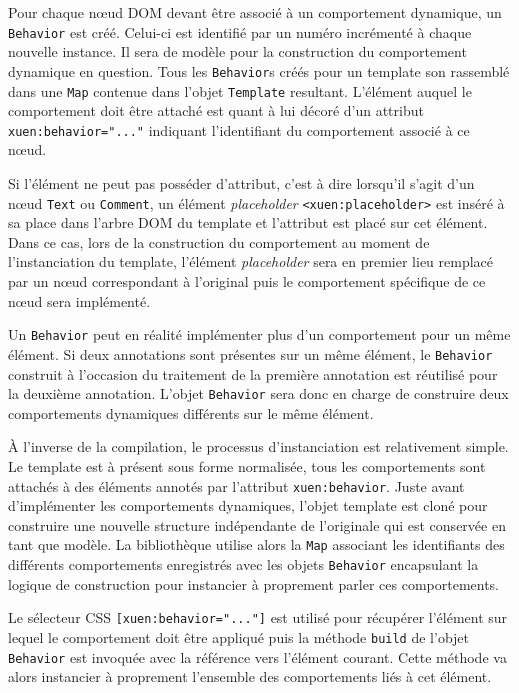 Pour chaque nœud DOM devant être associé à un comportement dynamique, un \texttt{Behavior} est créé. Celui-ci est identifié par un numéro incrémenté à chaque nouvelle instance. Il sera de modèle pour la construction du comportement dynamique en question. Tous les \texttt{Behavior}s créés pour un template son rassemblé dans une \texttt{Map} contenue dans l'objet \texttt{Template} resultant. L'élément auquel le comportement doit être attaché est quant à lui décoré d'un attribut \texttt{xuen:behavior="..."} indiquant l'identifiant du comportement associé à ce nœud.

Si l'élément ne peut pas posséder d'attribut, c'est à dire lorsqu'il s'agit d'un nœud \texttt{Text} ou \texttt{Comment}, un élément \emph{placeholder} \texttt{<xuen:placeholder>} est inséré à sa place dans l'arbre DOM du template et l'attribut est placé sur cet élément. Dans ce cas, lors de la construction du comportement au moment de l'instanciation du template, l'élément \emph{placeholder} sera en premier lieu remplacé par un nœud correspondant à l'original puis le comportement spécifique de ce nœud sera implémenté.

Un \texttt{Behavior} peut en réalité implémenter plus d'un comportement pour un même élément. Si deux annotations sont présentes sur un même élément, le \texttt{Behavior} construit à l'occasion du traitement de la première annotation est réutilisé pour la deuxième annotation. L'objet \texttt{Behavior} sera donc en charge de construire deux comportements dynamiques différents sur le même élément.

À l'inverse de la compilation, le processus d'instanciation est relativement simple. Le template est à présent sous forme normalisée, tous les comportements sont attachés à des éléments annotés par l'attribut \texttt{xuen:behavior}. Juste avant d'implémenter les comportements dynamiques, l'objet template est cloné pour construire une nouvelle structure indépendante de l'originale qui est conservée en tant que modèle. La bibliothèque utilise alors la \texttt{Map} associant les identifiants des différents comportements enregistrés avec les objets \texttt{Behavior} encapsulant la logique de construction pour instancier à proprement parler ces comportements.

Le sélecteur CSS \texttt{[xuen:behavior="..."]} est utilisé pour récupérer l'élément sur lequel le comportement doit être appliqué puis la méthode \texttt{build} de l'objet \texttt{Behavior} est invoquée avec la référence vers l'élément courant. Cette méthode va alors instancier à proprement l'ensemble des comportements liés à cet élément.

